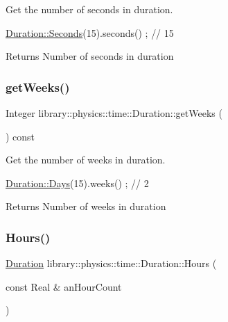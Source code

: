 Get the number of seconds in duration. 


\begin{DoxyCode}
\hyperlink{classlibrary_1_1physics_1_1time_1_1_duration_ae10891c94a1b2278c444cb44b37132f1}{Duration::Seconds}(15).seconds() ; \textcolor{comment}{// 15}
\end{DoxyCode}


\begin{DoxyReturn}{Returns}
Number of seconds in duration 
\end{DoxyReturn}
\mbox{\label{classlibrary_1_1physics_1_1time_1_1_duration_a11cf17341b43110b443ffd150571f43c}} 
\subsubsection{\texorpdfstring{get\+Weeks()}{getWeeks()}}
{\footnotesize\ttfamily Integer library\+::physics\+::time\+::\+Duration\+::get\+Weeks (\begin{DoxyParamCaption}{ }\end{DoxyParamCaption}) const}



Get the number of weeks in duration. 


\begin{DoxyCode}
\hyperlink{classlibrary_1_1physics_1_1time_1_1_duration_abf1323fa113b5203747ce9aec5c969fc}{Duration::Days}(15).weeks() ; \textcolor{comment}{// 2}
\end{DoxyCode}


\begin{DoxyReturn}{Returns}
Number of weeks in duration 
\end{DoxyReturn}
\mbox{\label{classlibrary_1_1physics_1_1time_1_1_duration_aadef86b1b803b8764380ef623f99ce95}} 
\subsubsection{\texorpdfstring{Hours()}{Hours()}}
{\footnotesize\ttfamily \hyperlink{classlibrary_1_1physics_1_1time_1_1_duration}{Duration} library\+::physics\+::time\+::\+Duration\+::\+Hours (\begin{DoxyParamCaption}\item[{const Real \&}]{an\+Hour\+Count }\end{DoxyParamCaption})\hspace{0.3cm}{\ttfamily [static]}}



